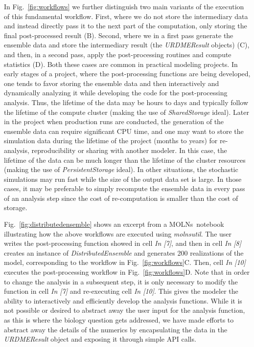 \documentclass[final,leqno,onefignum,onetabnum]{siamltex1213}
\def\packagename {MOLNs}
\begin{document}
In Fig.~\ref{fig:workflows} we further distinguish two main variants of the execution of this fundamental workflow. First, where we do not store the intermediary data and instead directly pass it to the next part of the computation, only storing the final post-processed result (B). Second, where we in a first pass generate the ensemble data and store the intermediary result (the \emph{URDMEResult} objects) (C), and then, in a second pass, apply the post-processing routines and compute statistics (D). Both these cases are common in practical modeling projects. In early stages of a project, where the post-processing functions are being developed, one tends to favor storing the ensemble data and then interactively and dynamically analyzing it while developing the code for the post-processing analysis. Thus, the lifetime of the data may be hours to days and typically follow the lifetime of the compute cluster (making the use of \emph{SharedStorage} ideal). Later in the project when production runs are conducted, the generation of the ensemble data can require significant CPU time, and one may want to store the simulation data during the lifetime of the project (months to years) for re-analysis, reproducibility or sharing with another modeler. In this case, the lifetime of the data can be much longer than the lifetime of the cluster resources (making the use of \emph{PersistentStorage} ideal). In other situations, the stochastic simulations may run fast while the size of the output data set is large. In those cases, it may be preferable to simply recompute the ensemble data in every pass of an analysis step since the cost of re-computation is smaller than the cost of storage. 

Fig.~\ref{fig:distributedensemble} shows an excerpt from a \packagename~notebook illustrating how the above workflows are executed using \emph{molnsutil}. The user writes the post-processing function showed in cell \emph{In [7]}, and then in cell \emph{In [8]} creates an instance of \emph{DistributedEnsemble} and generates 200 realizations of the model, corresponding to the workflow in Fig.~\ref{fig:workflows}C.  Then, cell \emph{In [10]} executes the post-processing workflow in  Fig.~\ref{fig:workflows}D. Note that in order to change the analysis in a subsequent step, it is only necessary to modify the function  in cell \emph{In [7]} and re-executing cell \emph{In [10]}. This gives the modeler the ability to interactively and efficiently develop the analysis functions. While it is not possible or desired to abstract away the user input for the analysis function, as this is where the biology question gets addressed, we have made efforts to abstract away the details of the numerics by encapsulating the data in the \emph{URDMEResult} object and exposing it through simple API calls. 
 
\end{document}
